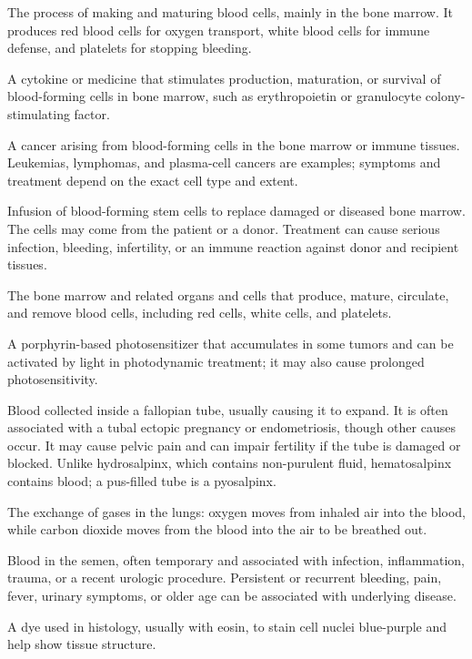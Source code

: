  The process of making and maturing blood cells, mainly in the bone marrow. It produces red blood cells for oxygen transport, white blood cells for immune defense, and platelets for stopping bleeding.

 A cytokine or medicine that stimulates production, maturation, or survival of blood-forming cells in bone marrow, such as erythropoietin or granulocyte colony-stimulating factor.

 A cancer arising from blood-forming cells in the bone marrow or immune tissues. Leukemias, lymphomas, and plasma-cell cancers are examples; symptoms and treatment depend on the exact cell type and extent.

 Infusion of blood-forming stem cells to replace damaged or diseased bone marrow. The cells may come from the patient or a donor. Treatment can cause serious infection, bleeding, infertility, or an immune reaction against donor and recipient tissues.

 The bone marrow and related organs and cells that produce, mature, circulate, and remove blood cells, including red cells, white cells, and platelets.

 A porphyrin-based photosensitizer that accumulates in some tumors and can be activated by light in photodynamic treatment; it may also cause prolonged photosensitivity.

 Blood collected inside a fallopian tube, usually causing it to expand. It is often associated with a tubal ectopic pregnancy or endometriosis, though other causes occur. It may cause pelvic pain and can impair fertility if the tube is damaged or blocked. Unlike hydrosalpinx, which contains non-purulent fluid, hematosalpinx contains blood; a pus-filled tube is a pyosalpinx.

 The exchange of gases in the lungs: oxygen moves from inhaled air into the blood, while carbon dioxide moves from the blood into the air to be breathed out.

 Blood in the semen, often temporary and associated with infection, inflammation, trauma, or a recent urologic procedure. Persistent or recurrent bleeding, pain, fever, urinary symptoms, or older age can be associated with underlying disease.

 A dye used in histology, usually with eosin, to stain cell nuclei blue-purple and help show tissue structure.


